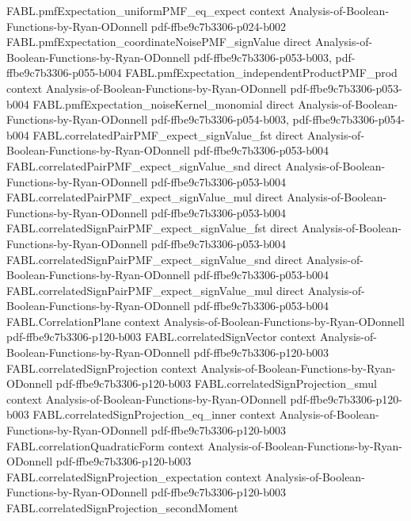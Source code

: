 \begin{theorem}
\proofstep
  {FABL.pmfExpectation_uniformPMF_eq_expect}
  {context}
  {Analysis-of-Boolean-Functions-by-Ryan-ODonnell}
  {pdf-ffbe9c7b3306-p024-b002}
\proofstep
  {FABL.pmfExpectation_coordinateNoisePMF_signValue}
  {direct}
  {Analysis-of-Boolean-Functions-by-Ryan-ODonnell}
  {pdf-ffbe9c7b3306-p053-b003,
    pdf-ffbe9c7b3306-p055-b004}
\proofstep
  {FABL.pmfExpectation_independentProductPMF_prod}
  {context}
  {Analysis-of-Boolean-Functions-by-Ryan-ODonnell}
  {pdf-ffbe9c7b3306-p053-b004}
\proofstep
  {FABL.pmfExpectation_noiseKernel_monomial}
  {direct}
  {Analysis-of-Boolean-Functions-by-Ryan-ODonnell}
  {pdf-ffbe9c7b3306-p054-b003,
    pdf-ffbe9c7b3306-p054-b004}
\proofstep
  {FABL.correlatedPairPMF_expect_signValue_fst}
  {direct}
  {Analysis-of-Boolean-Functions-by-Ryan-ODonnell}
  {pdf-ffbe9c7b3306-p053-b004}
\proofstep
  {FABL.correlatedPairPMF_expect_signValue_snd}
  {direct}
  {Analysis-of-Boolean-Functions-by-Ryan-ODonnell}
  {pdf-ffbe9c7b3306-p053-b004}
\proofstep
  {FABL.correlatedPairPMF_expect_signValue_mul}
  {direct}
  {Analysis-of-Boolean-Functions-by-Ryan-ODonnell}
  {pdf-ffbe9c7b3306-p053-b004}
\proofstep
  {FABL.correlatedSignPairPMF_expect_signValue_fst}
  {direct}
  {Analysis-of-Boolean-Functions-by-Ryan-ODonnell}
  {pdf-ffbe9c7b3306-p053-b004}
\proofstep
  {FABL.correlatedSignPairPMF_expect_signValue_snd}
  {direct}
  {Analysis-of-Boolean-Functions-by-Ryan-ODonnell}
  {pdf-ffbe9c7b3306-p053-b004}
\proofstep
  {FABL.correlatedSignPairPMF_expect_signValue_mul}
  {direct}
  {Analysis-of-Boolean-Functions-by-Ryan-ODonnell}
  {pdf-ffbe9c7b3306-p053-b004}
\proofstep
  {FABL.CorrelationPlane}
  {context}
  {Analysis-of-Boolean-Functions-by-Ryan-ODonnell}
  {pdf-ffbe9c7b3306-p120-b003}
\proofstep
  {FABL.correlatedSignVector}
  {context}
  {Analysis-of-Boolean-Functions-by-Ryan-ODonnell}
  {pdf-ffbe9c7b3306-p120-b003}
\proofstep
  {FABL.correlatedSignProjection}
  {context}
  {Analysis-of-Boolean-Functions-by-Ryan-ODonnell}
  {pdf-ffbe9c7b3306-p120-b003}
\proofstep
  {FABL.correlatedSignProjection_smul}
  {context}
  {Analysis-of-Boolean-Functions-by-Ryan-ODonnell}
  {pdf-ffbe9c7b3306-p120-b003}
\proofstep
  {FABL.correlatedSignProjection_eq_inner}
  {context}
  {Analysis-of-Boolean-Functions-by-Ryan-ODonnell}
  {pdf-ffbe9c7b3306-p120-b003}
\proofstep
  {FABL.correlationQuadraticForm}
  {context}
  {Analysis-of-Boolean-Functions-by-Ryan-ODonnell}
  {pdf-ffbe9c7b3306-p120-b003}
\proofstep
  {FABL.correlatedSignProjection_expectation}
  {context}
  {Analysis-of-Boolean-Functions-by-Ryan-ODonnell}
  {pdf-ffbe9c7b3306-p120-b003}
\proofstep
  {FABL.correlatedSignProjection_secondMoment}

\end{theorem}
